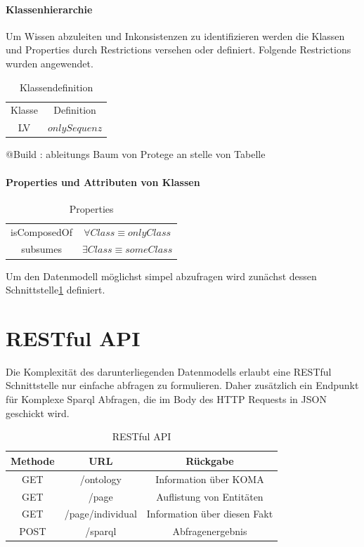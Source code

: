 \documentclass[
12pt,
english,
ngerman,
headsepline,
twoside,
openright,
numbers=noenddot,version=first
]{scrreprt}
\providecommand{\tabularnewline}{\\}
\begin{document}
\paragraph{Klassenhierarchie}
Um Wissen abzuleiten und Inkonsistenzen zu identifizieren werden die Klassen und Properties durch Restrictions versehen oder definiert. Folgende Restrictions wurden angewendet.
\begin{table}[H]
\caption{Klassendefinition}

\noindent \centering{}\begin{tabular}{cc}
\hline
\noalign{\vskip\doublerulesep}
Klasse & Definition \tabularnewline[\doublerulesep]
\noalign{\vskip\doublerulesep}
LV & $only Sequenz$ \tabularnewline[\doublerulesep]
\end{tabular}
\end{table}

@Build : ableitungs Baum von Protege an stelle von Tabelle

\paragraph{Properties und Attributen von Klassen}

\begin{table}[H]
\caption{Properties}

\noindent \centering{}\begin{tabular}{cc}
\hline
\noalign{\vskip\doublerulesep}
isComposedOf & $\forall{Class} \equiv only Class$ \tabularnewline[\doublerulesep]
\noalign{\vskip\doublerulesep}
subsumes & $\exists{Class} \equiv some Class$ \tabularnewline[\doublerulesep]
\end{tabular}
\end{table}


Um den Datenmodell möglichst simpel abzufragen wird zunächst dessen Schnittstelle\ref{sec:rest} definiert. 

\section{RESTful API}
\label{sec:rest}

Die Komplexität des darunterliegenden Datenmodells erlaubt eine RESTful Schnittstelle nur einfache abfragen zu formulieren. Daher zusätzlich ein Endpunkt für Komplexe Sparql Abfragen, die im Body des HTTP Requests in JSON geschickt wird. 

\begin{table}[H]
	\caption{RESTful API}\label{tab:rest}
	\noindent 
	\centering{}
	\begin{tabular}{ccc}
		\hline
		\noalign{\vskip\doublerulesep}
		Methode & URL & Rückgabe\tabularnewline[\doublerulesep]
		\hline
		\noalign{\vskip\doublerulesep}
		GET & /ontology & Information über KOMA
		\tabularnewline[\doublerulesep]\noalign{\vskip\doublerulesep}
		GET & /page & Auflistung von Entitäten 
		\tabularnewline[\doublerulesep]\noalign{\vskip\doublerulesep}
		GET & /page/individual & Information über diesen Fakt
		\tabularnewline[\doublerulesep]\noalign{\vskip\doublerulesep}
		POST & /sparql & Abfragenergebnis
		
	\end{tabular}
\end{table}
\end{document}
